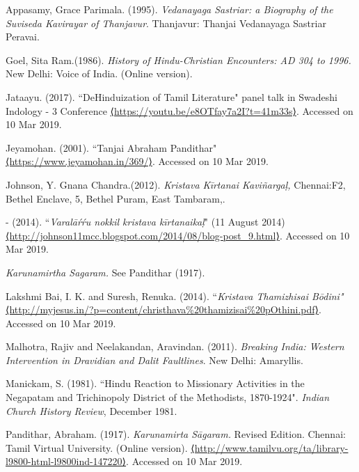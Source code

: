 \begin{thebibliography}{99}
\itemsep=0pt

  Appasamy, Grace Parimala. (1995). \textit{Vedanayaga Sastriar: a Biography of the Suviseda Kavirayar of Thanjavur}. Thanjavur: Thanjai Vedanayaga Sastriar Peravai.

  Goel, Sita Ram.(1986).\textit{ History of Hindu-Christian Encounters: AD 304 to 1996. }New Delhi: Voice of India. (Online version).

  Jataayu. (2017). ``DeHinduization of Tamil Literature" panel talk in Swadeshi Indology - 3 Conference \url{⟨https://youtu.be/e8OTfay7a2I?t=41m33s⟩}. Accessed on 10 Mar 2019.

  Jeyamohan. (2001). ``Tanjai Abraham Pandithar" \url{⟨https://www.jeyamohan.in/369/⟩}. Accessed on 10 Mar 2019.

  Johnson, Y. Gnana Chandra.(2012).\textit{ Kristava Kīrtanai Kaviñargaḷ, }Chennai:F2, Bethel Enclave, 5, Bethel Puram, East Tambaram,.

  - (2014). ``\textit{Varalāŕŕu nokkil kristava kīrtanaikaḷ}" (11 August 2014) \url{⟨http://johnson11mcc.blogspot.com/2014/08/blog-post_9.html⟩}. Accessed on 10 Mar 2019.

  \textit{Karunamirtha Sagaram. }See Pandithar (1917).

  Lakshmi Bai, I. K. and Suresh, Renuka. (2014). ``\textit{Kristava Thamizhisai Bōdini"} \url{⟨http://myjesus.in/?p=content/christhava%20thamizisai%20pOthini.pdf⟩}. Accessed on 10 Mar 2019.

  Malhotra, Rajiv and Neelakandan, Aravindan. (2011). \textit{Breaking India: Western Intervention in Dravidian and Dalit Faultlines}. New Delhi: Amaryllis.

  Manickam, S. (1981). ``Hindu Reaction to Missionary Activities in the Negapatam and Trichinopoly District of the Methodists, 1870-1924". \textit{Indian Church History Review}, December 1981.

  Pandithar, Abraham. (1917). \textit{Karunamirta Sāgaram. }Revised Edition. Chennai: Tamil Virtual University. (Online version). \url{⟨http://www.tamilvu.org/ta/library-l9800-html-l9800ind-147220⟩}. Accessed on 10 Mar 2019.


\end{thebibliography}
